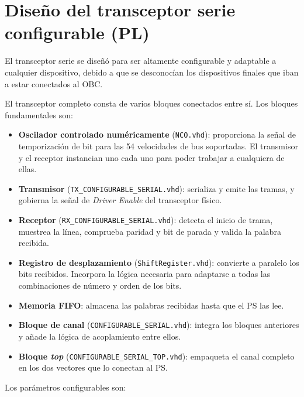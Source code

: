\section{Diseño del transceptor serie configurable (PL)} \label{sec:transceptor_pl}

El transceptor serie se diseñó para ser altamente configurable y adaptable a cualquier
dispositivo, debido a que se desconocían los dispositivos finales que iban a estar conectados
al OBC.

El transceptor completo consta de varios bloques conectados entre sí. Los bloques
fundamentales son:

\begin{itemize}
    \item \textbf{Oscilador controlado numéricamente} (\texttt{NCO.vhd}): proporciona la señal
    de temporización de bit para las 54 velocidades de bus soportadas. El transmisor y el
    receptor instancian uno cada uno para poder trabajar a cualquiera de ellas.
    \item \textbf{Transmisor} (\texttt{TX\_CONFIGURABLE\_SERIAL.vhd}): serializa y emite las
    tramas, y gobierna la señal de \textit{Driver Enable} del transceptor físico.
    \item \textbf{Receptor} (\texttt{RX\_CONFIGURABLE\_SERIAL.vhd}): detecta el inicio de trama,
    muestrea la línea, comprueba paridad y bit de parada y valida la palabra recibida.
    \item \textbf{Registro de desplazamiento} (\texttt{ShiftRegister.vhd}): convierte a paralelo
    los bits recibidos. Incorpora la lógica necesaria para adaptarse a todas las combinaciones
    de número y orden de los bits.
    \item \textbf{Memoria FIFO}: almacena las palabras recibidas hasta que el PS las lee.
    \item \textbf{Bloque de canal} (\texttt{CONFIGURABLE\_SERIAL.vhd}): integra los bloques
    anteriores y añade la lógica de acoplamiento entre ellos.
    \item \textbf{Bloque \textit{top}} (\texttt{CONFIGURABLE\_SERIAL\_TOP.vhd}): empaqueta el
    canal completo en los dos vectores que lo conectan al PS.
\end{itemize}

Los parámetros configurables son:

